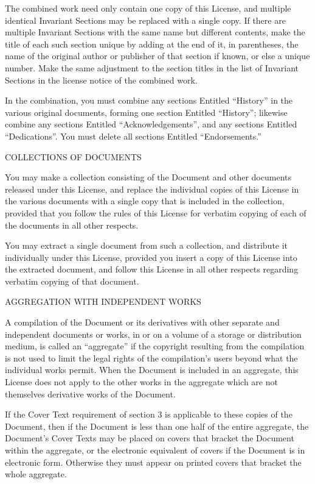 The combined work need only contain one copy of this License, and multiple identical Invariant Sections may be replaced with a single copy.  If there are multiple Invariant Sections with the same name but different contents, make the title of each such section unique by adding at the end of it, in parentheses, the name of the original author or publisher of that section if known, or else a unique number. Make the same adjustment to the section titles in the list of Invariant Sections in the license notice of the combined work.

In the combination, you must combine any sections Entitled ``History'' in the various original documents, forming one section Entitled ``History''; likewise combine any sections Entitled ``Acknowledgements'', and any sections Entitled ``Dedications''.  You must delete all sections Entitled ``Endorsements.''

\item
COLLECTIONS OF DOCUMENTS

You may make a collection consisting of the Document and other documents released under this License, and replace the individual copies of this License in the various documents with a single copy that is included in the collection, provided that you follow the rules of this License for verbatim copying of each of the documents in all other respects.

You may extract a single document from such a collection, and distribute it individually under this License, provided you insert a copy of this License into the extracted document, and follow this License in all other respects regarding verbatim copying of that document.

\item
AGGREGATION WITH INDEPENDENT WORKS

A compilation of the Document or its derivatives with other separate and independent documents or works, in or on a volume of a storage or distribution medium, is called an ``aggregate'' if the copyright resulting from the compilation is not used to limit the legal rights of the compilation's users beyond what the individual works permit. When the Document is included in an aggregate, this License does not apply to the other works in the aggregate which are not themselves derivative works of the Document.

If the Cover Text requirement of section 3 is applicable to these copies of the Document, then if the Document is less than one half of the entire aggregate, the Document's Cover Texts may be placed on covers that bracket the Document within the aggregate, or the electronic equivalent of covers if the Document is in electronic form. Otherwise they must appear on printed covers that bracket the whole aggregate.

